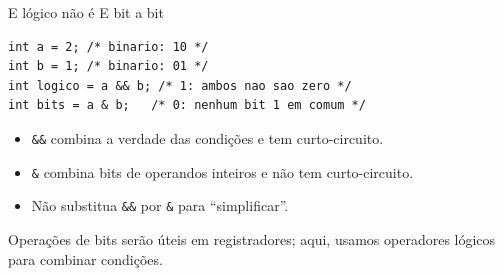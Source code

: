 \begin{frame}[fragile]{E lógico não é E bit a bit}
\begin{lstlisting}
int a = 2; /* binario: 10 */
int b = 1; /* binario: 01 */
int logico = a && b; /* 1: ambos nao sao zero */
int bits = a & b;   /* 0: nenhum bit 1 em comum */
\end{lstlisting}
\begin{itemize}
\item \texttt{\&\&} combina a verdade das condições e tem curto-circuito.
\item \texttt{\&} combina bits de operandos inteiros e não tem curto-circuito.
\item Não substitua \texttt{\&\&} por \texttt{\&} para ``simplificar''.
\end{itemize}
\small Operações de bits serão úteis em registradores; aqui, usamos operadores lógicos para combinar condições.
\end{frame}
